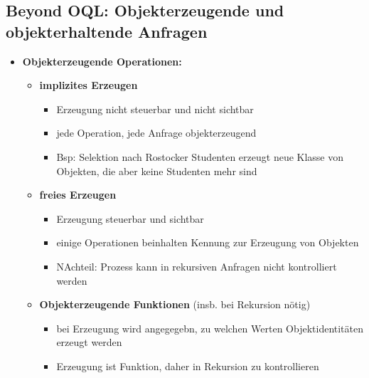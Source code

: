 \subsection{Beyond OQL: Objekterzeugende und objekterhaltende Anfragen}
\begin{itemize}
	\item \textbf{Objekterzeugende Operationen:}\\
	\begin{itemize}
		\item \textbf{implizites Erzeugen}
		\begin{itemize}
			\item Erzeugung nicht steuerbar und nicht sichtbar
			\item jede Operation, jede Anfrage objekterzeugend
			\item Bsp: Selektion nach Rostocker Studenten erzeugt neue Klasse von Objekten, die aber keine Studenten mehr sind
		\end{itemize}
		\item \textbf{freies Erzeugen}
		\begin{itemize}
			\item Erzeugung steuerbar und sichtbar
			\item einige Operationen beinhalten Kennung zur Erzeugung von Objekten
			\item NAchteil: Prozess kann in rekursiven Anfragen nicht kontrolliert werden
		\end{itemize}
		\item \textbf{Objekterzeugende Funktionen} (insb. bei Rekursion nötig)
		\begin{itemize}
			\item bei Erzeugung wird angegegebn, zu welchen Werten Objektidentitäten erzeugt werden
			\item Erzeugung ist Funktion, daher in Rekursion zu kontrollieren
		\end{itemize}
	\end{itemize}
	

\end{itemize}
